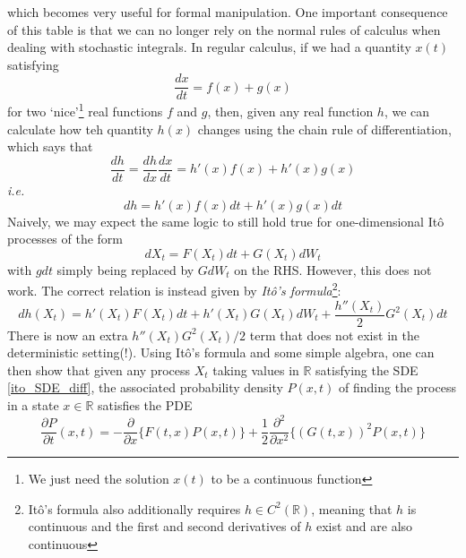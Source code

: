 which becomes very useful for formal manipulation. One important consequence of this table is that we can no longer rely on the normal rules of calculus when dealing with stochastic integrals. In regular calculus, if we had a quantity $x(t)$ satisfying
\begin{equation*}
	\frac{dx}{dt} = f(x) + g(x)
\end{equation*}
for two `nice'\footnote{We just need the solution $x(t)$ to be a continuous function} real functions $f$ and $g$, then, given any real function $h$, we can calculate how teh quantity $h(x)$ changes using the chain rule of differentiation, which says that
\begin{equation*}
\frac{dh}{dt} = \frac{dh}{dx}\frac{dx}{dt} = h'(x)f(x) + h'(x)g(x)
\end{equation*}
\emph{i.e.}
\begin{equation*}
dh =  h'(x)f(x)dt + h'(x)g(x)dt
\end{equation*}
Naively, we may expect the same logic to still hold true for one-dimensional It\^o processes of the form
\begin{equation*}
dX_t = F(X_t)dt + G(X_t)dW_t
\end{equation*}
with $gdt$ simply being replaced by $GdW_t$ on the RHS. However, this does not work. The correct relation is instead given by 
\emph{It\^o's formula}\footnote{It\^o's formula also additionally requires $h \in C^2(\mathbb{R})$, meaning that $h$ is continuous and the first and second derivatives of $h$ exist and are also continuous}:
\begin{equation*}
dh(X_t) = h'(X_t)F(X_t)dt + h'(X_t)G(X_t)dW_t  + \frac{h''(X_t)}{2}G^2(X_t)dt 
\end{equation*}
There is now an extra $h''(X_t)G^2(X_t)/2$ term that does not exist in the deterministic setting(!). Using It\^o's formula and some simple algebra, one can then show that given any process $X_t$ taking values in $\mathbb{R}$ satisfying the SDE \eqref{ito_SDE_diff}, the associated probability density $P(x,t)$ of finding the process in a state $x \in \mathbb{R}$ satisfies the PDE
\begin{equation}
\label{ito_FPE}
\frac{\partial P}{\partial t}(x,t) = -\frac{\partial}{\partial x}\{F(t,x)P(x,t)\} + \frac{1}{2}\frac{\partial^2}{\partial x^2}\{(G(t,x))^2P(x,t)\}
\end{equation}
